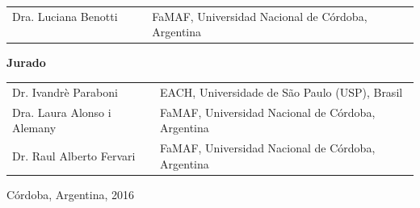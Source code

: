 \begin{center}
\begin{tabular}{ll}
Dra. Luciana Benotti $~~~~~~~~~~$ & FaMAF, Universidad Nacional de C\'ordoba, Argentina
\end{tabular}

\vspace{5mm}
\textbf{Jurado}

\vspace{5mm}

\begin{tabular}{ll}
Dr. Ivandr\`e Paraboni & EACH, Universidade de S\~ao Paulo (USP), Brasil \\
Dra. Laura Alonso i Alemany & FaMAF, Universidad Nacional de C\'ordoba, Argentina \\
Dr. Raul Alberto Fervari & FaMAF, Universidad Nacional de C\'ordoba, Argentina \\
\end{tabular}

\vspace{15mm}

\noindent C\'ordoba, Argentina, 2016
\end{center}
\newpage
\mbox{}
\thispagestyle{empty}
